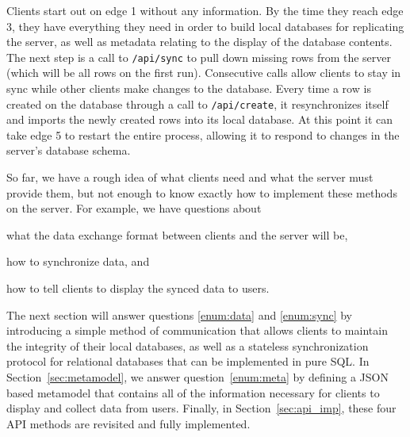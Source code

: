 Clients start out on edge 1 without any information. By the time they reach edge
3, they have everything they need in order to build local databases for
replicating the server, as well as metadata relating to the display of the
database contents. The next step is a call to \texttt{/api/sync} to pull down
missing rows from the server (which will be all rows on the first run).
Consecutive calls allow clients to stay in sync while other clients make
changes to the database. Every time a row is created on the database through
a call to \texttt{/api/create}, it resynchronizes itself and imports the newly
created rows into its local database. At this point it can take edge 5 to
restart the entire process, allowing it to respond to changes in the server's
database schema.

So far, we have a rough idea of what clients need and what the server
must provide them, but not enough to know exactly how to implement these methods
on the server. For example, we have questions about
\begin{inparaenum}
\item\label{enum:data} what the data exchange format between clients and the server will be, 
\item\label{enum:sync} how to synchronize data, and
\item\label{enum:meta} how to tell clients to display the synced data to users. 
\end{inparaenum}

The next section will answer questions \ref{enum:data} and
\ref{enum:sync} by introducing a simple method of communication that allows
clients to maintain the integrity of their local databases, as well as a
stateless synchronization protocol for relational databases that can be
implemented in pure SQL. In Section~\ref{sec:metamodel}, we answer
question~\ref{enum:meta} by defining a JSON based metamodel that contains all of
the information necessary for clients to display and collect data from users.
Finally, in Section~\ref{sec:api_imp}, these four API methods are revisited and
fully implemented.



